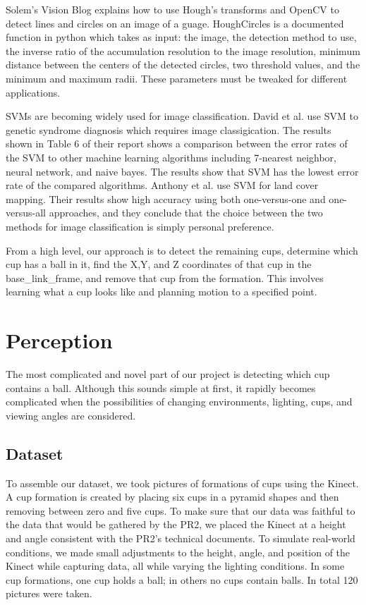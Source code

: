 \documentclass[letterpaper, 10 pt, conference]{ieeeconf}  %
\begin{document}
Solem’s Vision Blog explains how to use Hough’s transforms and OpenCV to detect lines and circles on an image of a guage. HoughCircles is a documented function in python which takes as input: the image, the detection method to use, the inverse ratio of the accumulation resolution to the image resolution, minimum distance between the centers of the detected circles, two threshold values, and the minimum and maximum radii. These parameters must be tweaked for different applications.

SVMs are becoming widely used for image classification. David et al. use SVM to genetic syndrome diagnosis which requires image classigication. The results shown in Table 6 of their report shows a comparison between the error rates of the SVM to other machine learning algorithms including 7-nearest neighbor, neural network, and naive bayes. The results show that SVM has the lowest error rate of the compared algorithms. Anthony et al. use SVM for land cover mapping. Their results show high accuracy using both one-versus-one and one-versus-all approaches, and they conclude that the choice between the two methods for image classification is simply personal preference.

From a high level, our approach is to detect the remaining cups, determine which cup has a ball in it, find the X,Y, and Z coordinates of that cup in the base\_link\_frame, and remove that cup from the formation.  This involves learning what a cup looks like and planning motion to a specified point.

\section{Perception}
		
The most complicated and novel part of our project is detecting which cup contains a ball.  Although this sounds simple at first, it rapidly becomes complicated when the possibilities of changing environments, lighting, cups, and viewing angles are considered.

\subsection{Dataset}

To assemble our dataset, we took pictures of formations of cups using the Kinect.  A cup formation is created by placing six cups in a pyramid shapes and then removing between zero and five cups.  To make sure that our data was faithful to the data that would be gathered by the PR2, we placed the Kinect at a height and angle consistent with the PR2's technical documents.  To simulate real-world conditions, we made small adjustments to the height, angle, and position of the Kinect while capturing data, all while varying the lighting conditions.  In some cup formations, one cup holds a ball; in others no cups contain balls.  In total 120 pictures were taken.
\end{document}
